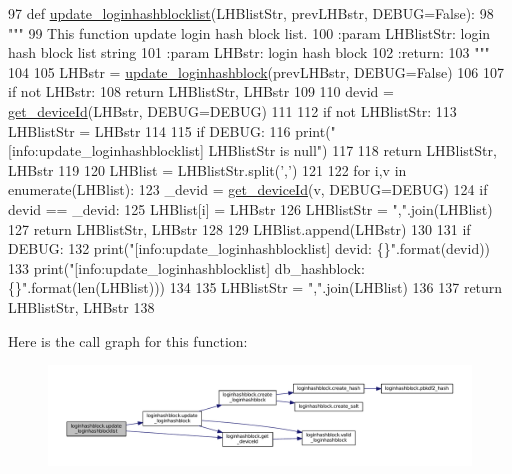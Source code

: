 \begin{DoxyCode}
97 \textcolor{keyword}{def }\hyperlink{namespaceloginhashblock_a2bcc7ddd0fcc3788572dd77808cb624d}{update\_loginhashblocklist}(LHBlistStr, prevLHBstr, DEBUG=False):
98     \textcolor{stringliteral}{"""}
99 \textcolor{stringliteral}{    This function update login hash block list.}
100 \textcolor{stringliteral}{    :param LHBlistStr: login hash block list string}
101 \textcolor{stringliteral}{    :param LHBstr: login hash block}
102 \textcolor{stringliteral}{    :return:}
103 \textcolor{stringliteral}{    """}
104 
105     LHBstr = \hyperlink{namespaceloginhashblock_afef75d97c834ce0fda711b93d0b56b00}{update\_loginhashblock}(prevLHBstr, DEBUG=\textcolor{keyword}{False})
106 
107     \textcolor{keywordflow}{if} \textcolor{keywordflow}{not} LHBstr:
108         \textcolor{keywordflow}{return} LHBlistStr, LHBstr
109 
110     devid = \hyperlink{namespaceloginhashblock_a17417f2f6bca76ab51170082a562e5f6}{get\_deviceId}(LHBstr, DEBUG=DEBUG)
111 
112     \textcolor{keywordflow}{if} \textcolor{keywordflow}{not} LHBlistStr:
113         LHBlistStr = LHBstr
114         
115         \textcolor{keywordflow}{if} DEBUG:
116             print(\textcolor{stringliteral}{"[info:update\_loginhashblocklist] LHBlistStr is null"})
117 
118         \textcolor{keywordflow}{return} LHBlistStr, LHBstr
119 
120     LHBlist = LHBlistStr.split(\textcolor{stringliteral}{','})
121 
122     \textcolor{keywordflow}{for} i,v \textcolor{keywordflow}{in} enumerate(LHBlist):
123         \_devid = \hyperlink{namespaceloginhashblock_a17417f2f6bca76ab51170082a562e5f6}{get\_deviceId}(v, DEBUG=DEBUG)
124         \textcolor{keywordflow}{if} devid == \_devid:
125             LHBlist[i] = LHBstr
126             LHBlistStr = \textcolor{stringliteral}{","}.join(LHBlist)
127             \textcolor{keywordflow}{return} LHBlistStr, LHBstr
128 
129     LHBlist.append(LHBstr)
130 
131     \textcolor{keywordflow}{if} DEBUG:
132         print(\textcolor{stringliteral}{"[info:update\_loginhashblocklist] devid: \{\}"}.format(devid))
133         print(\textcolor{stringliteral}{"[info:update\_loginhashblocklist] db\_hashblock: \{\}"}.format(len(LHBlist)))
134 
135     LHBlistStr = \textcolor{stringliteral}{","}.join(LHBlist)
136 
137     \textcolor{keywordflow}{return} LHBlistStr, LHBstr
138 
\end{DoxyCode}


Here is the call graph for this function\+:
\nopagebreak
\begin{figure}[H]
\begin{center}
\leavevmode
\includegraphics[width=350pt]{namespaceloginhashblock_a2bcc7ddd0fcc3788572dd77808cb624d_cgraph}
\end{center}
\end{figure}




